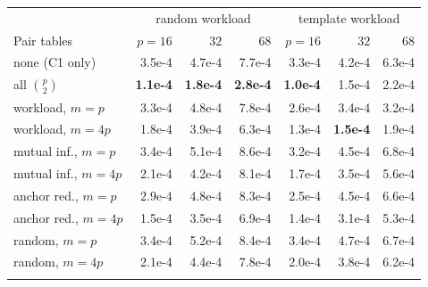 \begin{tabular}{lrrrrrr}
\toprule
 & \multicolumn{3}{c}{random workload} & \multicolumn{3}{c}{template workload} \\
Pair tables & $p{=}16$ & $32$ & $68$ & $p{=}16$ & $32$ & $68$ \\
\midrule
none (C1 only) & 3.5e-4 & 4.7e-4 & 7.7e-4 & 3.3e-4 & 4.2e-4 & 6.3e-4 \\
all $\binom p2$ & \textbf{1.1e-4} & \textbf{1.8e-4} & \textbf{2.8e-4} & \textbf{1.0e-4} & 1.5e-4 & 2.2e-4 \\
\addlinespace[2pt]
workload, $m=p$ & 3.3e-4 & 4.8e-4 & 7.8e-4 & 2.6e-4 & 3.4e-4 & 3.2e-4 \\
workload, $m=4p$ & 1.8e-4 & 3.9e-4 & 6.3e-4 & 1.3e-4 & \textbf{1.5e-4} & 1.9e-4 \\
\addlinespace[2pt]
mutual inf., $m=p$ & 3.4e-4 & 5.1e-4 & 8.6e-4 & 3.2e-4 & 4.5e-4 & 6.8e-4 \\
mutual inf., $m=4p$ & 2.1e-4 & 4.2e-4 & 8.1e-4 & 1.7e-4 & 3.5e-4 & 5.6e-4 \\
\addlinespace[2pt]
anchor red., $m=p$ & 2.9e-4 & 4.8e-4 & 8.3e-4 & 2.5e-4 & 4.5e-4 & 6.6e-4 \\
anchor red., $m=4p$ & 1.5e-4 & 3.5e-4 & 6.9e-4 & 1.4e-4 & 3.1e-4 & 5.3e-4 \\
\addlinespace[2pt]
random, $m=p$ & 3.4e-4 & 5.2e-4 & 8.4e-4 & 3.4e-4 & 4.7e-4 & 6.7e-4 \\
random, $m=4p$ & 2.1e-4 & 4.4e-4 & 7.8e-4 & 2.0e-4 & 3.8e-4 & 6.2e-4 \\
\addlinespace[2pt]
\bottomrule
\end{tabular}
